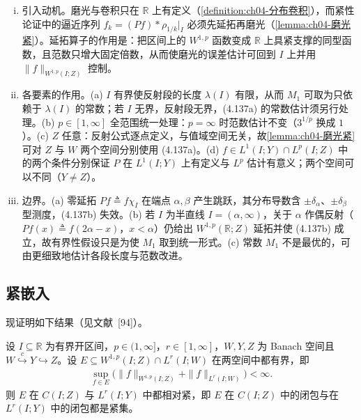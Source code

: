 \documentclass[../../main.tex]{subfiles}%
\begin{document}
\begin{remark}\label{remark:ch04-延拓动机}
\begin{enumerate}[(i)]
\item 引入动机。磨光与卷积只在 $\mathbb{R}$ 上有定义（\cref{definition:ch04-分布卷积}），而紧性论证中的逼近序列 $f_k=(Pf)*\rho_{1/k}|_I$ 必须先延拓再磨光（\cref{lemma:ch04-磨光紧}）。延拓算子的作用是：把区间上的 $W^{1,p}$ 函数变成 $\mathbb{R}$ 上具紧支撑的同型函数，且范数只增大固定倍数，从而使磨光的误差估计可回到 $I$ 上并用 $\|f\|_{W^{1,p}(I;Z)}$ 控制。

\item 各要素的作用。(a) $I$ 有界使反射段的长度 $\lambda(I)$ 有限，从而 $M_1$ 可取为只依赖于 $\lambda(I)$ 的常数；若 $I$ 无界，反射段无界，(4.137a) 的常数估计须另行处理。(b) $p\in[1,\infty]$ 全范围统一处理：$p=\infty$ 时范数估计不变（$3^{1/p}$ 换成 $1$）。(c) $Z$ 任意：反射公式逐点定义，与值域空间无关，故\cref{lemma:ch04-磨光紧}可对 $Z$ 与 $W$ 两个空间分别使用 (4.137a)。(d) $f\in L^1(I;Y)\cap L^p(I;Z)$ 中的两个条件分别保证 $P$ 在 $L^1(I;Y)$ 上有定义与 $L^p$ 估计有意义；两个空间可以不同（$Y\neq Z$）。

\item 边界。(a) 零延拓 $Pf\triangleq f\chi_I$ 在端点 $\alpha,\beta$ 产生跳跃，其分布导数含 $\pm\delta_\alpha$、$\pm\delta_\beta$ 型测度，(4.137b) 失效。(b) 若 $I$ 为半直线 $I=(\alpha,\infty)$，关于 $\alpha$ 作偶反射（$Pf(x)\triangleq f(2\alpha-x)$，$x<\alpha$）仍给出 $W^{1,p}(\mathbb{R};Z)$ 延拓并使 (4.137b) 成立，故有界性假设只是为使 $M_1$ 取到统一形式。(c) 常数 $M_1$ 不是最优的，可由更细致地估计各段长度与范数改进。
\end{enumerate}
\end{remark}

\subsection{紧嵌入}\label{subsection:ch04-紧嵌入}

现证明如下结果（见文献~[94]）。

\begin{theorem}[Aubin]\label{theorem:ch04-Aubin}
设 $I\subseteq\mathbb{R}$ 为有界开区间，$p\in(1,\infty]$，$r\in[1,\infty]$，$W,Y,Z$ 为 Banach 空间且 $W\overset{c}{\hookrightarrow}Y\hookrightarrow Z$。设 $E\subseteq W^{1,p}(I;Z)\cap L^r(I;W)$ 在两空间中都有界，即
\begin{align}
\sup_{f\in E}\big(\|f\|_{W^{1,p}(I;Z)}+\|f\|_{L^r(I;W)}\big)<\infty. \label{align:ch04-4.138}
\end{align}
则 $E$ 在 $C(I;Z)$ 与 $L^r(I;Y)$ 中都相对紧，即 $E$ 在 $C(I;Z)$ 中的闭包与在 $L^r(I;Y)$ 中的闭包都是紧集。
\end{theorem}
\end{document}
